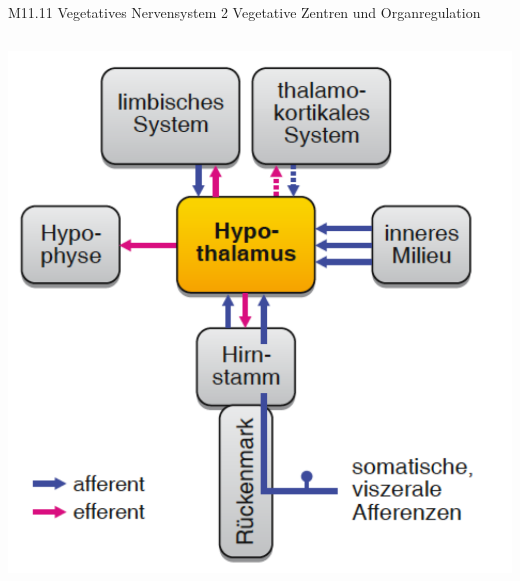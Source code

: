 \documentclass{beamer}
\begin{document}
\begin{frame}{M11.11 Vegetatives Nervensystem 2 Vegetative Zentren und Organregulation}
\begin{columns}[c]
\begin{column}{5cm}
    \begin{center}
        \includegraphics[width=\textwidth]{hypothalamus_nabel_der_welt.png}
    \end{center}
    
    
    
    \end{column}
    
    
    \end{columns}
    
    
    
\end{frame}




    
\end{document}
